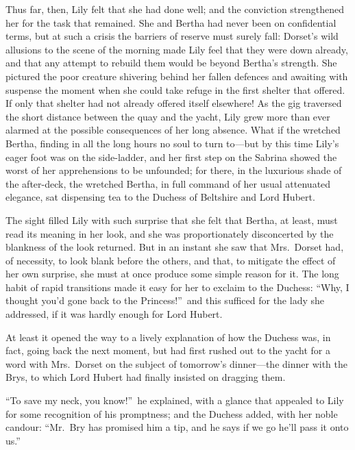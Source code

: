 \documentclass[12pt,a4paper]{book}
\begin{document}
Thus far, then, Lily felt that she had done well; and the
conviction strengthened her for the task that remained. She and
Bertha had never been on confidential terms, but at such a crisis
the barriers of reserve must surely fall: Dorset's wild allusions
to the scene of the morning made Lily feel that they were down
already, and that any attempt to rebuild them would be beyond
Bertha's strength. She pictured the poor creature shivering
behind her fallen defences and awaiting with suspense the moment
when she could take refuge in the first shelter that offered. If
only that shelter had not already offered itself elsewhere! As
the gig traversed the short distance between the quay and the
yacht, Lily grew more than ever alarmed at the possible
consequences of her long absence. What if the wretched Bertha,
finding in all the long hours no soul to turn to---but by this
time Lily's eager foot was on the side-ladder, and her first step
on the Sabrina showed the worst of her apprehensions to be
unfounded; for there, in the luxurious shade of the after-deck,
the wretched Bertha, in full command of her usual attenuated
elegance, sat dispensing tea to the Duchess of Beltshire and Lord
Hubert.





The sight filled Lily with such surprise that she felt that
Bertha, at least, must read its meaning in her look, and she was
proportionately disconcerted by the blankness of the look
returned. But in an instant she saw that Mrs.\ Dorset had, of
necessity, to look blank before the others, and that, to mitigate
the effect of her own surprise, she must at once produce some
simple reason for it. The long habit of rapid transitions made it
easy for her to exclaim to the Duchess: ``Why, I thought you'd
gone back to the Princess!''\ and this sufficed for the lady she
addressed, if it was hardly enough for Lord Hubert.





At least it opened the way to a lively explanation of how the
Duchess was, in fact, going back the next moment, but had first
rushed out to the yacht for a word with Mrs.\ Dorset on the
subject of tomorrow's dinner---the dinner with the Brys, to which
Lord Hubert had finally insisted on dragging them.





``To save my neck, you know!''\ he explained, with a glance that
appealed to Lily for some recognition of his promptness; and the
Duchess added, with her noble candour: ``Mr.\ Bry has promised him
a tip, and he says if we go he'll pass it onto us.''
\end{document}
